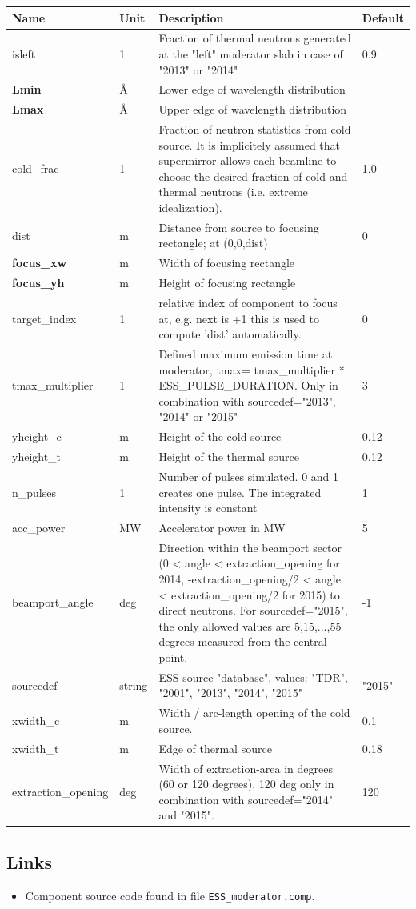\begin{longtable}{p{}p{}p{}p{}}
\toprule
\textbf{Name} & \textbf{Unit} & \textbf{Description} & \textbf{Default} \\
\midrule
\endhead
isleft & 1 & Fraction of thermal neutrons generated at the "left" moderator slab in case of "2013" or "2014" & 0.9 \\
\textbf{Lmin} & \AA{} & Lower edge of wavelength distribution &  \\
\textbf{Lmax} & \AA{} & Upper edge of wavelength distribution &  \\
cold\_frac & 1 & Fraction of neutron statistics from cold source. It is implicitely assumed that supermirror allows each beamline to choose the desired fraction of cold and thermal neutrons (i.e. extreme idealization). & 1.0 \\
dist & m & Distance from source to focusing rectangle; at (0,0,dist) & 0 \\
\textbf{focus\_xw} & m & Width of focusing rectangle &  \\
\textbf{focus\_yh} & m & Height of focusing rectangle &  \\
target\_index & 1 & relative index of component to focus at, e.g. next is +1 this is used to compute 'dist' automatically. & 0 \\
tmax\_multiplier & 1 & Defined maximum emission time at moderator, tmax= tmax\_multiplier * ESS\_PULSE\_DURATION. Only in combination with sourcedef="2013", "2014" or "2015" & 3 \\
yheight\_c & m & Height of the cold source & 0.12 \\
yheight\_t & m & Height of the thermal source & 0.12 \\
n\_pulses & 1 & Number of pulses simulated. 0 and 1 creates one pulse. The integrated intensity is constant & 1 \\
acc\_power & MW & Accelerator power in MW & 5 \\
beamport\_angle & deg & Direction within the beamport sector (0 \textless{} angle \textless{} extraction\_opening for 2014, -extraction\_opening/2 \textless{} angle \textless{} extraction\_opening/2 for 2015) to direct neutrons. For sourcedef="2015", the only allowed values are 5,15,...,55 degrees measured from the central point. & -1 \\
sourcedef & string & ESS source "database", values: "TDR", "2001", "2013", "2014", "2015" & "2015" \\
xwidth\_c & m & Width / arc-length opening of the cold source. & 0.1 \\
xwidth\_t & m & Edge of thermal source & 0.18 \\
extraction\_opening & deg & Width of extraction-area in degrees (60 or 120 degrees). 120 deg only in combination with sourcedef="2014" and "2015". & 120 \\
\bottomrule
\end{longtable}

\subsection*{Links}
\begin{itemize}
  \item Component source code found in file \texttt{ESS\_moderator.comp}.
\end{itemize}
